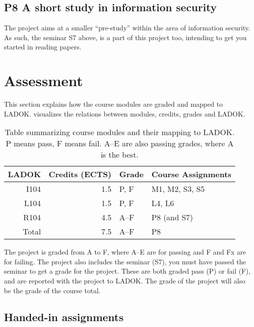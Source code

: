 \subsection{P8 A short study in information security}

The project aims at a smaller \enquote{pre-study} within the area of 
information security.
As such, the seminar S7 above, is a part of this project too, intending to get 
you started in reading papers.


\section{Assessment}%
\label{Assessment}

This section explains how the course modules are graded and mapped to LADOK\@.
 visualizes the relations between modules, credits, grades and 
LADOK\@.

\begin{table}
  \centering
  \setlength{\tabcolsep}{0.5em}
  \begin{tabular}{r r l l}
    \toprule
    LADOK & Credits (ECTS)  & Grade       & Course Assignments\\
    \midrule
    I104  & 1.5             & P, F        & M1, M2, S3, S5\\
    L104  & 1.5             & P, F        & L4, L6\\
    R104  & 4.5             & A--F        & P8 (and S7)\\
    \midrule
    Total & 7.5             & A--F        & P8\\
    \bottomrule
  \end{tabular}
  \caption{%
    Table summarizing course modules and their mapping to LADOK\@.
    P means pass, F means fail.
    A--E are also passing grades, where A is the best.
  }\label{LADOKTable}
\end{table}

The project is graded from A to F, where A--E are for passing and F and Fx are 
for failing.
The project also includes the seminar (S7), \ie you must have passed the seminar 
to get a grade for the project.
These are both graded pass (P) or fail (F), and are reported with the project 
to LADOK\@.
The grade of the project will also be the grade of the course total.

\subsection{Handed-in assignments}

